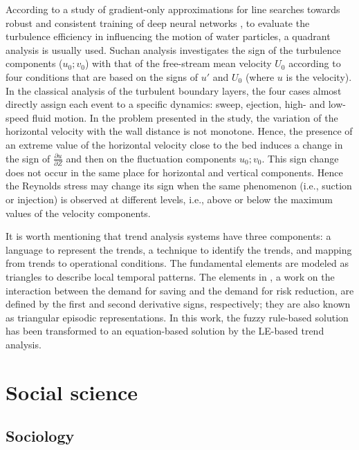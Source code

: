 \documentclass[11pt]{book}
\begin{document}
According to a study of gradient-only approximations
for line searches towards robust and consistent training of deep neural
networks \cite{corvaro2014fluid}, to evaluate the turbulence efficiency in influencing the motion of
\textquotedbl water particles\textquotedbl{},
a quadrant analysis is usually used. Suchan analysis investigates
the sign of the turbulence components ($u_{0};v_{0}$) with that of
the free-stream mean velocity $U_{0}$ according to four conditions
that are based on the signs of $u'$ and $U_{0}$ (where $u$ is the
velocity). In the classical analysis of the turbulent boundary layers,
the four cases almost directly assign each event to a specific dynamics:
sweep, ejection, high- and low-speed fluid motion. In the
problem presented in the study, the variation of the horizontal velocity with the wall distance
is not monotone. Hence, the presence of an extreme value of the horizontal
velocity close to the bed induces a change in the sign of $\frac{\partial u}{\partial Z}$
and then on the fluctuation components $u_{0};v_{0}$. This sign change
does not occur in the same place for horizontal and vertical components.
Hence the Reynolds stress may change its sign when the same phenomenon
(i.e., suction or injection) is observed at different levels, i.e.,
above or below the maximum values of the velocity components.

It is worth mentioning that trend analysis systems have three components: a language to represent
the trends, a technique to identify the trends, and mapping from trends
to operational conditions. The fundamental elements are modeled as
triangles to describe local temporal patterns. 
The elements in \cite{juuso2018intelligent}, a work on the interaction between the demand for saving and
the demand for risk reduction, are defined by the first and second derivative signs, respectively; they are also known as triangular episodic representations. In this work, the fuzzy
rule-based solution has been transformed to an equation-based solution
by the LE-based trend analysis.


\section{Social science}


\subsection{Sociology}
\end{document}
